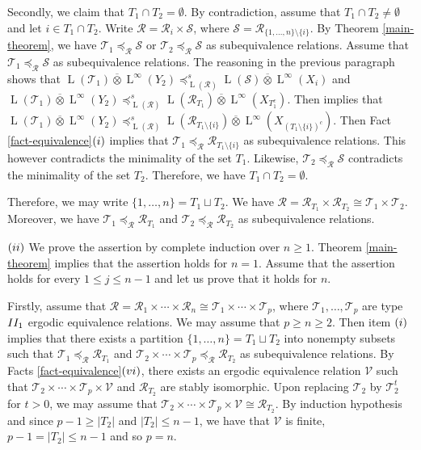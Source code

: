 \documentclass[11pt]{amsart}
\numberwithin{equation}{section}
\theoremstyle{plain}
\theoremstyle{definition}
\newcommand{\ovt}{\mathbin{\overline{\otimes}}}
\newcommand{\rL}{\operatorname{L}}
\begin{document}
Secondly, we claim that $T_1 \cap T_2 = \emptyset$. By contradiction, assume that $T_1 \cap T_2 \neq \emptyset$ and let $i \in T_1 \cap T_2$. Write $\mathscr R = \mathscr R_i \times \mathscr S$, where $\mathscr S = \mathscr R_{\{1, \dots, n\} \setminus \{i\}}$. By Theorem \ref{main-theorem}, we have $\mathscr T_1 \preceq_{\mathscr R} \mathscr S$ or $\mathscr T_2 \preceq_{\mathscr R} \mathscr S$ as subequivalence relations. Assume that $\mathscr T_1 \preceq_{\mathscr R} \mathscr S$ as subequivalence relations. The reasoning in the previous paragraph shows that $\rL(\mathscr T_1) \ovt \rL^\infty(Y_2) \preceq^s_{\rL(\mathscr R)} \rL(\mathscr S) \ovt \rL^\infty(X_i)$ and $\rL(\mathscr T_1) \ovt \rL^\infty(Y_2) \preceq^s_{\rL(\mathscr R)} \rL(\mathscr R_{T_1}) \ovt \rL^\infty(X_{T_1^c})$. Then \cite[Lemma 2.8(2)]{DHI16} implies that $\rL(\mathscr T_1) \ovt \rL^\infty(Y_2) \preceq^s_{\rL(\mathscr R)} \rL(\mathscr R_{T_1 \setminus \{i\}}) \ovt \rL^\infty(X_{(T_1 \setminus \{i\})^c })$. Then Fact \ref{fact-equivalence}$(\rm i)$ implies that $\mathscr T_1 \preceq_{\mathscr R} \mathscr R_{T_1 \setminus \{i\}}$ as subequivalence relations. This however contradicts the minimality of the set $T_1$. Likewise, $\mathscr T_2 \preceq_{\mathscr R} \mathscr S$ contradicts the minimality of the set $T_2$. Therefore, we have $T_1 \cap T_2 = \emptyset$.

Therefore, we may write $\{1, \dots, n\} = T_1 \sqcup T_2$. We have $\mathscr R = \mathscr R_{T_1} \times \mathscr R_{T_2} \cong \mathscr T_1 \times \mathscr T_2$. Moreover, we have $\mathscr T_1 \preceq_{\mathscr R} \mathscr R_{T_1}$ and $\mathscr T_2 \preceq_{\mathscr R} \mathscr R_{T_2}$ as subequivalence relations. 


$(\rm ii)$ We prove the assertion by complete induction over $n \geq 1$. Theorem \ref{main-theorem} implies that the assertion holds for $n = 1$. Assume that the assertion holds for every $1 \leq j \leq n - 1$ and let us prove that it holds for $n$. 

Firstly, assume that $\mathscr R = \mathscr R_1 \times \cdots \times \mathscr R_{n} \cong \mathscr T_1 \times \cdots \times \mathscr T_p$, where $\mathscr T_1, \dots, \mathscr T_p$ are type ${\rm II_1}$ ergodic equivalence relations. We may assume that $p \geq n \geq 2$. Then item $(\rm i)$ implies that there exists a partition $\{1, \dots, n\} = T_1 \sqcup T_2$ into nonempty subsets such that $\mathscr T_1 \preceq_{\mathscr R} \mathscr R_{T_1}$ and $\mathscr T_2 \times \cdots \times \mathscr T_p \preceq_{\mathscr R} \mathscr R_{T_2}$ as subequivalence relations. By Facts \ref{fact-equivalence}$(\rm vi)$, there exists an ergodic equivalence relation $\mathscr V$ such that $\mathscr T_2 \times \cdots \times \mathscr T_p \times \mathscr V$ and $\mathscr R_{T_2}$ are stably isomorphic. Upon replacing $\mathscr T_2$ by $\mathscr T_2^t$ for $t > 0$, we may assume that $\mathscr T_2 \times \cdots \times \mathscr T_{p} \times \mathscr V \cong \mathscr R_{T_2}$. By induction hypothesis and since $p - 1 \geq |T_2|$ and $|T_2| \leq n- 1$, we have that $\mathscr V$ is finite, $p - 1 = |T_2| \leq n - 1$ and so $p = n$.
\end{document}
